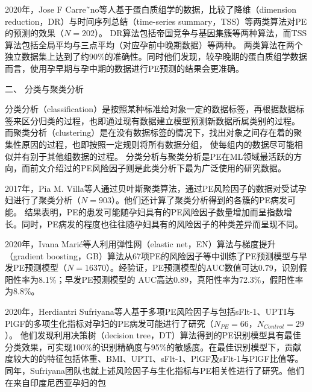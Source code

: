 2020年，Jose F Carre˜no等人\cite{Carreno2020}基于蛋白质组学的数据，比较了降维（dimension reduction，DR）与时间序列总结（time-series summary，TSS）等两类算法对PE的预测的效果（$N=202$）。
DR算法包括帝国竞争与基因集簇等两种算法，而TSS算法包括全局平均与三点平均（对应孕前中晚期数据）等两种。
两类算法在两个独立数据集上达到了约90\%的准确性。同时他们发现，较孕晚期的蛋白质组学数据而言，使用孕早期与孕中期的数据进行PE预测的结果会更准确。

二、 分类与聚类分析

分类分析（classification）是按照某种标准给对象一定的数据标签，再根据数据标签来区分归类的过程，也即通过现有数据建立模型预测新数据所属类别的过程。
而聚类分析（clustering）是在没有数据标签的情况下，找出对象之间存在着的聚集性原因的过程，也即按照一定规则将所有数据分组，
使每组内的数据尽可能相似并有别于其他组数据的过程\cite{Han2006}。
分类分析与聚类分析是PE在ML领域最活跃的方向，而前文介绍过的PE风险因子则是此类分析下最为广泛使用的研究数据。

2017年，Pia M. Villa等人\cite{Villa2017}通过贝叶斯聚类算法，通过PE风险因子的数据对受试孕妇进行了聚类分析（$N=903$）。他们还计算了聚类分析得到的各簇的PE病发可能。
结果表明，PE的患发可能随孕妇具有的PE风险因子数量增加而呈指数增长。同时，PE病发的程度也往往随孕妇具有的风险因子的种类差异而呈现不同。

2020年，Ivana Mari{\'{c}}\cite{Maric2020}等人利用弹性网（elastic net，EN）算法与梯度提升（gradient boosting，GB）算法从67项PE的风险因子等中训练了PE预测模型与早发PE预测模型（$N=16 370$）。经验证，PE预测模型的AUC数值可达0.79，识别假阳性率为8.1\%；早发PE预测模型的
AUC高达0.89，真阳性率为72.3\%，假阳性率为8.8\%。

2020年，Herdiantri Sufriyana等人\cite{Sufriyana2020-1}基于多项PE风险因子与包括sFlt-1、UPTI与PlGF的多项生化指标对孕妇的PE病发可能进行了研究（$N_{PE}=66$，$N_{Control}=29$）。
他们发现利用决策树（decision tree，DT）算法得到的PE识别模型具有最佳分类效果，可实现100\%的识别精确度与95\%的敏感度。在最佳识别模型下，贡献度较大的的特征包括体重、BMI、UPTI、sFlt-1、PlGF及sFlt-1与PlGF比值等。
同年，Sufriyana团队也就上述风险因子与生化指标与PE相关性进行了研究\cite{Sufriyana2020}。他们在来自印度尼西亚孕妇的包


